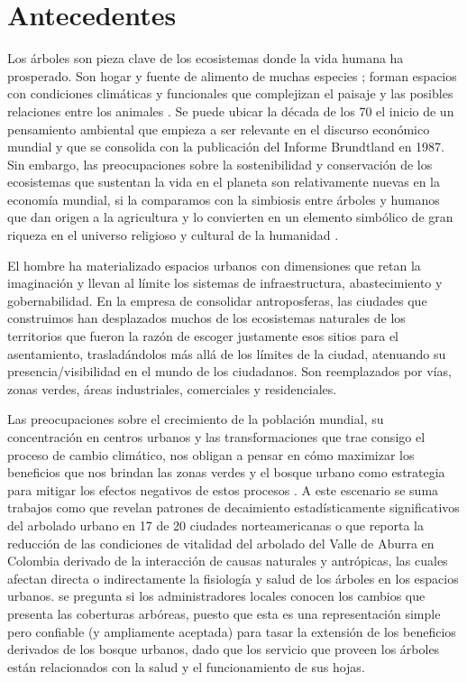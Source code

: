\documentclass[12pt,]{book}
\begin{document}
\section{Antecedentes}\label{antecedentes}

Los árboles son pieza clave de los ecosistemas donde la vida humana ha
prosperado. Son hogar y fuente de alimento de muchas especies
\citep{osorio_vuelo_2009}; forman espacios con condiciones climáticas y
funcionales que complejizan el paisaje y las posibles relaciones entre
los animales \citep{chapman_forests_1998}. Se puede ubicar la década de
los 70 el inicio de un pensamiento ambiental que empieza a ser relevante
en el discurso económico mundial\citep{leff_pensamiento_2012} y que se
consolida con la publicación del Informe Brundtland en 1987. Sin
embargo, las preocupaciones sobre la sostenibilidad y conservación de
los ecosistemas que sustentan la vida en el planeta son relativamente
nuevas en la economía mundial, si la comparamos con la simbiosis entre
árboles y humanos que dan origen a la agricultura y lo convierten en un
elemento simbólico de gran riqueza en el universo religioso y cultural
de la humanidad \citep{leon_calle_arboles_2011}.

El hombre ha materializado espacios urbanos con dimensiones que retan la
imaginación y llevan al límite los sistemas de infraestructura,
abastecimiento y gobernabilidad. En la empresa de consolidar
antroposferas, las ciudades que construimos han desplazados muchos de
los ecosistemas naturales de los territorios que fueron la razón de
escoger justamente esos sitios para el asentamiento, trasladándolos más
allá de los límites de la ciudad, atenuando su presencia/visibilidad en
el mundo de los ciudadanos. Son reemplazados por vías, zonas verdes,
áreas industriales, comerciales y
residenciales\citep{azocar_urbanization_2007}.

Las preocupaciones sobre el crecimiento de la población mundial, su
concentración en centros urbanos y las transformaciones que trae consigo
el proceso de cambio climático, nos obligan a pensar en cómo maximizar
los beneficios que nos brindan las zonas verdes y el bosque urbano como
estrategia para mitigar los efectos negativos de estos procesos
\citep{nesbitt_exploring_2016, laredo_gestion_2011}. A este escenario se
suma trabajos como \citep{nowak_tree_2012} que revelan patrones de
decaimiento estadísticamente significativos del arbolado urbano en 17 de
20 ciudades norteamericanas o \citep{restrepo_incidence_2015} que
reporta la reducción de las condiciones de vitalidad del arbolado del
Valle de Aburra en Colombia derivado de la interacción de causas
naturales y antrópicas, las cuales afectan directa o indirectamente la
fisiología y salud de los árboles en los espacios urbanos.
\citet{nowak_tree_2012} se pregunta si los administradores locales
conocen los cambios que presenta las coberturas arbóreas, puesto que
esta es una representación simple pero confiable (y ampliamente
aceptada) para tasar la extensión de los beneficios derivados de los
bosque urbanos, dado que los servicio que proveen los árboles están
relacionados con la salud y el funcionamiento de sus hojas.
\end{document}
